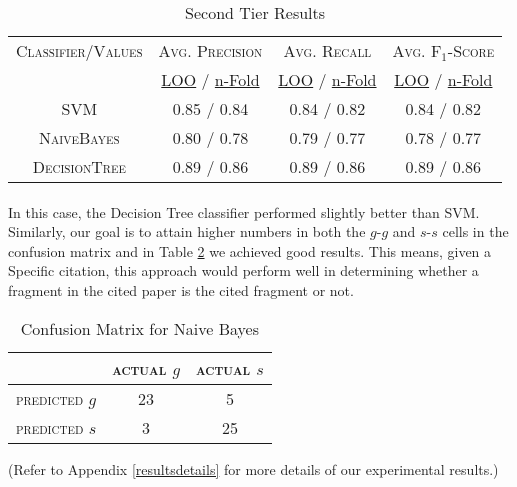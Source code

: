 \begin{table}[h]
	\center
	\begin{tabular}{ c | c  c  c }
		\textsc{Classifier/Values} & \textsc{Avg. Precision} & \textsc{Avg. Recall} & \textsc{Avg. F$_1$-Score} \\
		& \url{LOO} / \url{n-Fold} & \url{LOO} / \url{n-Fold} & \url{LOO} / \url{n-Fold} \\
		\hline
		\textsc{SVM} 			& 0.85 / 0.84 & 0.84 / 0.82 & 0.84 / 0.82 \\
		\textsc{NaiveBayes} 	& 0.80 / 0.78 & 0.79 / 0.77 & 0.78 / 0.77 \\
		\textsc{DecisionTree}	& 0.89 / 0.86 & 0.89 / 0.86 & 0.89 / 0.86
	\end{tabular}
	\caption{Second Tier Results}
	\label{tab:secondtieresults}
\end{table}
\newpage
\paragraph{}
In this case, the Decision Tree classifier performed slightly better than SVM. Similarly, our goal is to attain higher numbers in both the $g$-$g$ and $s$-$s$ cells in the confusion matrix and in Table \ref{tab:decisiontreeconfusionmatrix} we achieved good results. This means, given a Specific citation, this approach would perform well in determining whether a fragment in the cited paper is the cited fragment or not.

\begin{table}[h]
	\center
	\begin{tabular}{ c | c  c }
		 & \textsc{actual $g$} & \textsc{actual $s$} \\
		\hline
		\textsc{predicted $g$} 	& 23 & 5 \\
		\textsc{predicted $s$}		& 3 & 25
	\end{tabular}
	\caption{Confusion Matrix for Naive Bayes}
	\label{tab:decisiontreeconfusionmatrix}
\end{table}

(Refer to Appendix \ref{resultsdetails} for more details of our experimental results.)